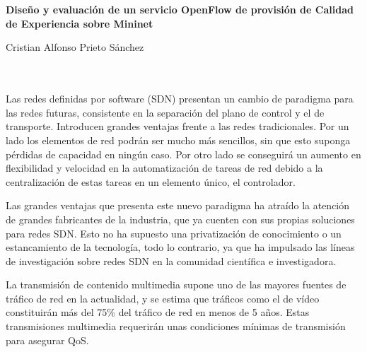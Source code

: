 \chapter*{}






\cleardoublepage
\thispagestyle{empty}

\begin{center}
{\large\bfseries Diseño y evaluación de un servicio OpenFlow de provisión de Calidad de Experiencia sobre Mininet}\\
\end{center}
\begin{center}
Cristian Alfonso Prieto Sánchez\\
\end{center}

\\

\vspace{0.7cm}
\\

Las redes definidas por software (\ac{SDN}) presentan un cambio de paradigma para las redes futuras, consistente en la separación del plano de control y el de transporte. Introducen grandes ventajas frente a las redes tradicionales. Por un lado los elementos de red podrán ser mucho más sencillos, sin que esto suponga pérdidas de capacidad en ningún caso. Por otro lado se conseguirá un aumento en flexibilidad y velocidad en la automatización de tareas de red debido a la centralización de estas tareas en un elemento único, el controlador.

Las grandes ventajas que presenta este nuevo paradigma ha atraído la atención de grandes fabricantes de la industria, que ya cuenten con sus propias soluciones para redes \ac{SDN}. Esto no ha supuesto una privatización de conocimiento o un estancamiento de la tecnología, todo lo contrario, ya que ha impulsado las líneas de investigación sobre redes \ac{SDN} en la comunidad científica e investigadora.

La transmisión de contenido multimedia supone uno de las mayores fuentes de tráfico de red en la actualidad, y se estima que tráficos como el de vídeo constituirán más del 75\% del tráfico de red en menos de 5 años. Estas transmisiones multimedia requerirán unas condiciones mínimas de transmisión para asegurar \ac{QoS}. 


